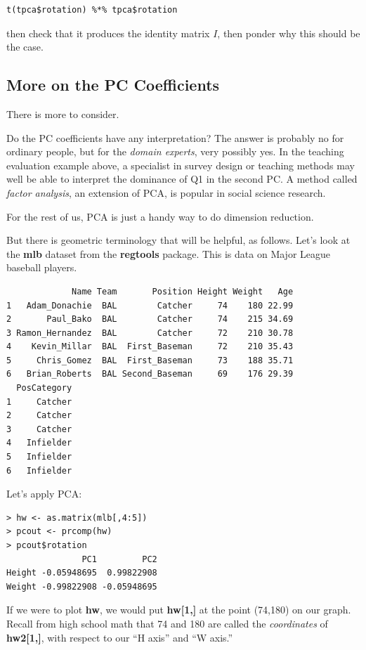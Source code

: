 \begin{lstlisting}
t(tpca$rotation) %*% tpca$rotation
\end{lstlisting}

then check that it produces the identity matrix $I$, then ponder why
this should be the case.

\subsection{More on the PC Coefficients}
\label{coors}

There is more to consider.

Do the PC coefficients have any interpretation?  The answer is
probably no for ordinary people, but for the \textit{domain experts},
very possibly yes.  In the teaching evaluation example above, a
specialist in survey design or teaching methods may well be able to
interpret the dominance of Q1 in the second PC.  A method called
\textit{factor analysis}, an extension of PCA, is popular in social
science research.

For the rest of us, PCA is just a handy way to do dimension reduction.

But there is geometric terminology that will be helpful, as follows.
Let's look at the \textbf{mlb} dataset from the \textbf{regtools}
package.  This is data on Major League baseball players.

\begin{lstlisting}
             Name Team       Position Height Weight   Age
1   Adam_Donachie  BAL        Catcher     74    180 22.99
2       Paul_Bako  BAL        Catcher     74    215 34.69
3 Ramon_Hernandez  BAL        Catcher     72    210 30.78
4    Kevin_Millar  BAL  First_Baseman     72    210 35.43
5     Chris_Gomez  BAL  First_Baseman     73    188 35.71
6   Brian_Roberts  BAL Second_Baseman     69    176 29.39
  PosCategory
1     Catcher
2     Catcher
3     Catcher
4   Infielder
5   Infielder
6   Infielder
\end{lstlisting}

Let's apply PCA:

\begin{lstlisting}
> hw <- as.matrix(mlb[,4:5]) 
> pcout <- prcomp(hw) 
> pcout$rotation 
               PC1         PC2
Height -0.05948695  0.99822908
Weight -0.99822908 -0.05948695
\end{lstlisting}

If we were to plot \textbf{hw}, we would put \textbf{hw[1,]} at the
point (74,180) on our graph.  Recall from high school math that 74 and
180 are called the \textit{coordinates} of \textbf{hw2[1,]}, with
respect to our ``H axis'' and ``W axis.''

